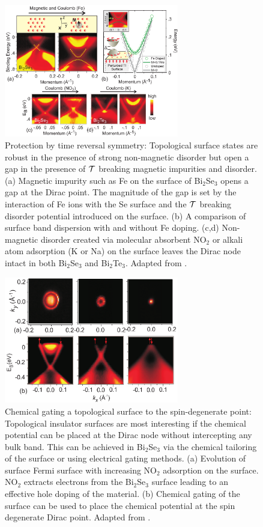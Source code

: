\documentclass[twocolumn,floatfix,showpacs,rmp,aps]{revtex4}
\begin{document}
\begin{figure}
\includegraphics[width=3in]{Fig15}%
\caption{ Protection by time reversal
symmetry: Topological surface states are robust in the presence of
strong non-magnetic disorder but open a gap in the presence of
${\cal T}$ breaking magnetic impurities and disorder. (a) Magnetic
impurity such as Fe on the surface of Bi$_2$Se$_3$ opens a gap at the
Dirac point. The magnitude of the gap is set by the interaction of Fe
ions with the Se surface and the ${\cal T}$ breaking disorder
potential introduced on the surface. (b) A comparison of surface band
dispersion with and without Fe doping. (c,d) Non-magnetic disorder
created via molecular absorbent NO$_2$ or alkali atom adsorption (K
or Na) on the surface leaves the Dirac node intact in both
Bi$_2$Se$_3$ and Bi$_2$Te$_3$.  Adapted from .}
\label{fig:zfig5}
\end{figure}

\begin{figure}
\includegraphics[width=3in]{Fig16}%
\caption{
Chemical gating a topological
surface to the spin-degenerate point: Topological insulator surfaces
are most interesting if the chemical potential can be placed at the
Dirac node without intercepting any bulk band. This can be
achieved in Bi$_2$Se$_3$ via the chemical tailoring of the surface or
using electrical gating methods. (a) Evolution of surface Fermi
surface with increasing NO$_2$ adsorption on the surface.
NO$_2$ extracts electrons from the Bi$_2$Se$_3$ surface leading to an
effective hole doping of the material. (b) Chemical gating of the
surface can be used to place the chemical potential at the spin
degenerate Dirac point.  Adapted from .}
\label{fig:zfig6}
\end{figure}
\end{document}
